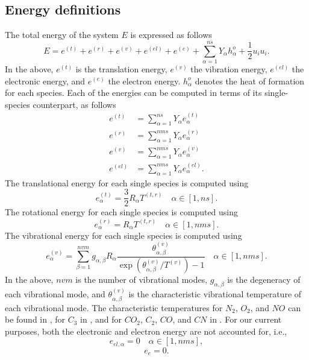 \documentclass[oneside,a4paper,11pt]{report}
\begin{document}
\subsection{Energy definitions}
The total energy of the system $E$ is expressed as follows
\begin{equation}
E = e^{(t)} + e^{(r)} + e^{(v)} + e^{(el)} + e^{(e)} + \sum_{\alpha =1}^{ns} Y_\alpha h_\alpha^o + \frac{1}{2}u_i u_i .
\end{equation}
In the above, $e^{(t)}$ is the translation energy, $e^{(v)}$ the vibration energy, $e^{(el)}$ the electronic energy, and $e^{(e)}$ the electron energy. $h_\alpha^o$ denotes the heat of formation for each species. Each of the energies can be computed in terms of its single-species counterpart, as follows
\begin{align}
e^{(t)} &= \sum_{\alpha =1}^{ns} Y_\alpha e^{(t)}_\alpha \\
e^{(r)} & = \sum_{\alpha = 1}^{nms} Y_\alpha e^{(r)}_\alpha \\
e^{(v)} & = \sum_{\alpha =1}^{nms} Y_\alpha e^{(v)}_\alpha \\
e^{(el)} & = \sum_{\alpha =1}^{nms} Y_\alpha e^{(el)}_\alpha.
\end{align}
The translational energy for each single species is computed using
\begin{equation}
e^{(t)}_\alpha = \frac{3}{2} R_\alpha T^{(t,r)} \quad \alpha \in [1,ns].
\end{equation}
The rotational energy for each single species is computed using
\begin{equation}
e^{(r)}_\alpha = R_\alpha T^{(t,r)} \quad \alpha \in [1,nms].
\end{equation}
The vibrational energy for each single species is computed using
\begin{equation}
e^{(v)}_\alpha = \sum_{\beta = 1}^{nvm} g_{\alpha,\beta}R_\alpha \frac{\theta^{(v)}_{\alpha,\beta}}{\exp \left ( \theta^{(v)}_{\alpha,\beta} / T^{(v)} \right ) - 1} \quad \alpha \in [1,nms].
\end{equation}
In the above, $nvm$ is the number of vibrational modes, $g_{\alpha,\beta}$ is the degeneracy of each vibrational mode, and $\theta^{(v)}_{\alpha,\beta}$ is the characteristic vibrational temperature of each vibrational mode. The characteristic temperatures for $N_2$, $O_2$, and $NO$ can be found in \cite{park1990}, for $C_3$ in \cite{dolton1968}, and for $CO_2$, $C_2$, $CO$, and $CN$ in \cite{mcbride1963}. For our current purposes, both the electronic and electron energy are not accounted for, i.e.,
\begin{equation}
e_{el,\alpha} = 0  \quad \alpha \in [1,nms],
\end{equation}
\begin{equation}
e_e = 0.
\end{equation}
\end{document}

